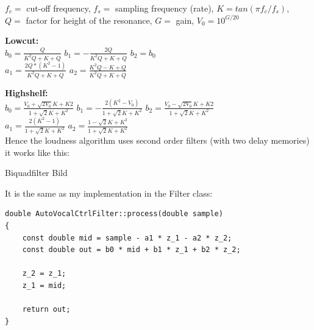 $f_c = $ cut-off frequency, $f_s = $ sampling frequency (rate), $K = tan(\pi f_{c}/f_{s})$,\\
$Q = $ factor for height of the resonance, $G = $ gain, $V_0 = 10^{G/20}$

\textbf{Lowcut:}\\
$b_0 = \frac{Q}{K^{2}Q+K+Q}$ \tab $b_1 = -\frac{2Q}{K^{2}Q+K+Q}$ \tab $b_2 = b_0$\\
$a_1 = \frac{2Q*(K^{2}-1)}{K^{2}Q+K+Q}$ \tab $a_2 = \frac{K^{2}Q-K+Q}{K^{2}Q+K+Q}$

\textbf{Highshelf:}\\
$b_0 = \frac{V_0+\sqrt{2V_0}K+K2}{1+\sqrt{2}K+K^2}$ \tab[0.4cm] $b_1 = -\frac{2(K^2-V_0)}{1+\sqrt{2}K+K^2}$ \tab $b_2 = \frac{V_0-\sqrt{2V_0}K+K2}{1+\sqrt{2}K+K^2}$\\
$a_1 = \frac{2(K^2-1)}{1+\sqrt{2}K+K^2}$ \tab $a_2 = \frac{1-\sqrt{2}K+K^2}{1+\sqrt{2}K+K^2}$\\

Hence the loudness algorithm uses second order filters (with two delay memories) it works like this:

Biquadfilter Bild

It is the same as my implementation in the Filter class:\\

\begin{lstlisting}[frame=single]
double AutoVocalCtrlFilter::process(double sample)
{
    const double mid = sample - a1 * z_1 - a2 * z_2;
    const double out = b0 * mid + b1 * z_1 + b2 * z_2;
    
    z_2 = z_1;
    z_1 = mid;
    
    return out;
}
\end{lstlisting}


